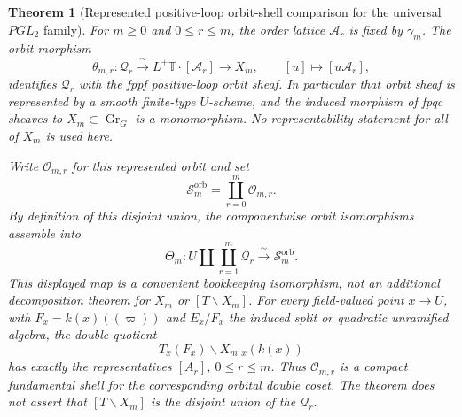 \documentclass[11pt]{article}
\newtheorem{theorem}{Theorem}[section]
\theoremstyle{definition}
\theoremstyle{remark}
\begin{document}
\begin{theorem}[Represented positive-loop orbit-shell comparison for the universal $PGL_2$ family]
\label{thm:PGL2-residual-orbit-comparison}
For $m\ge0$ and $0\le r\le m$, the order lattice $\mathcal A_r$ is fixed by
$\gamma_m$.  The orbit morphism
\begin{equation}
 \theta_{m,r}:\mathscr Q_r
 \xrightarrow{\ \sim\ }
 L^+\mathbb T\cdot[\mathcal A_r]
 \longrightarrow X_m,
 \qquad [u]\longmapsto[u\mathcal A_r],
 \label{eq:PGL2-orbit-morphism}
\end{equation}
identifies $\mathscr Q_r$ with the fppf positive-loop orbit sheaf.  In
particular that orbit sheaf is represented by a smooth finite-type $U$-scheme,
and the induced morphism of fpqc sheaves to
$X_m\subset\operatorname{Gr}_G$ is a monomorphism.  No representability
statement for all of $X_m$ is used here.

Write $\mathscr O_{m,r}$ for this represented orbit and set
\begin{equation}
 \mathscr S_m^{\mathrm{orb}}
 =\coprod_{r=0}^m\mathscr O_{m,r}.
 \label{eq:PGL2-actual-shell-union}
\end{equation}
By definition of this disjoint union, the componentwise orbit isomorphisms
assemble into
\begin{equation}
 \Theta_m:
 U\amalg\coprod_{r=1}^m\mathscr Q_r
 \xrightarrow{\ \sim\ }\mathscr S_m^{\mathrm{orb}}.
 \label{eq:PGL2-residual-orbital-isomorphism}
\end{equation}
This displayed map is a convenient bookkeeping isomorphism, not an additional
decomposition theorem for $X_m$ or $[T\backslash X_m]$.
For every field-valued point $x\to U$, with
$F_x=k(x)((\varpi))$ and $E_x/F_x$ the induced split or quadratic unramified
algebra, the double quotient
\[
 T_x(F_x)\backslash X_{m,x}(k(x))
\]
has exactly the representatives $[A_r]$, $0\le r\le m$.  Thus
$\mathscr O_{m,r}$ is a compact fundamental shell for the corresponding
orbital double coset.  The theorem does not assert that
$[T\backslash X_m]$ is the disjoint union of the $\mathscr Q_r$.
\end{theorem}
\end{document}
